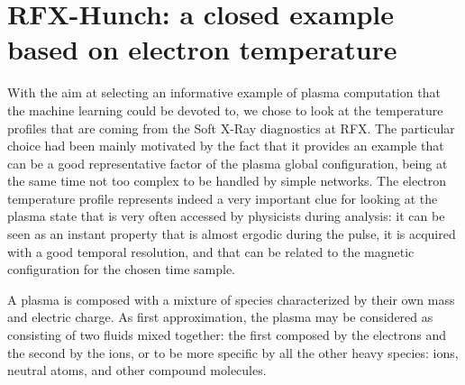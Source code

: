 \chapter{RFX-Hunch: a closed example based on electron temperature}
\label{section:RFXhunch}

With the aim at selecting an informative example of plasma computation that the machine learning could be devoted to, we chose to look at the temperature profiles that are coming from the Soft X-Ray diagnostics at RFX. The particular choice had been mainly motivated by the fact that it provides an example that can be a good representative factor of the plasma global configuration, being at the same time not too complex to be handled by simple networks. The electron temperature profile represents indeed a very important clue for looking at the plasma state that is very often accessed by physicists during analysis: it can be seen as an instant property that is almost ergodic during the pulse, it is acquired with a good temporal resolution, and that can be related to the magnetic configuration for the chosen time sample.

A plasma is composed with a mixture of species characterized by their own mass and electric charge. As first approximation, the plasma may be considered as consisting of two fluids mixed together: the first composed by the electrons and the second by the ions, or to be more specific by all the other heavy species: ions, neutral atoms, and other compound molecules.

